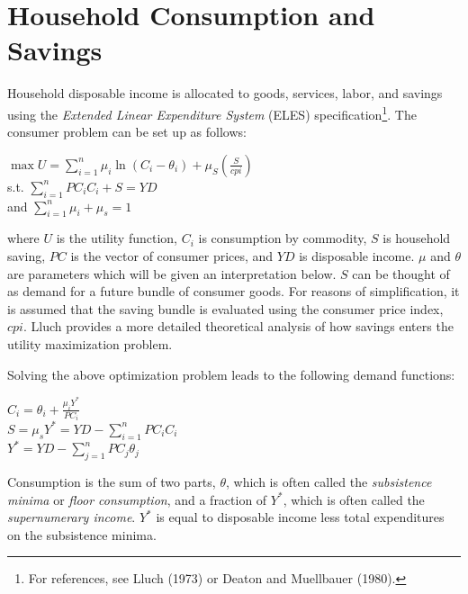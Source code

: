 \documentclass[12pt]{article}
\begin{document}
\section{Household Consumption and Savings}

Household disposable income is allocated to goods, services, labor, and savings using the \textit{Extended Linear Expenditure System} (ELES) specification\footnote{For references, see Lluch (1973) or Deaton and Muellbauer (1980).}. The consumer problem can be set up as follows:

\begin{center}

$\max U = \displaystyle \sum_{i=1}^n\mu_i\ln(C_i - \theta_i) + \mu_S\left(\frac{S}{cpi}\right)$\\
s.t. $\displaystyle \sum_{i=1}^n PC_iC_i + S = YD$\\
and $\sum_{i=1}^n\mu_i + \mu_s = 1$

\end{center}

where $U$ is the utility function, $C_i$ is consumption by commodity, $S$ is household saving, $PC$ is the vector of consumer prices, and $YD$ is disposable income. $\mu$ and $\theta$ are parameters which will be given an interpretation below. $S$ can be thought of as demand for a future bundle of consumer goods. For reasons of simplification, it is assumed that the saving bundle is evaluated using the consumer price index, $cpi$. Lluch provides a more detailed theoretical analysis of how savings enters the utility maximization problem.

Solving the above optimization problem leads to the following demand functions:
\begin{center}

$C_i = \theta_i + \frac{\mu_iY^*}{PC_i}$\\
$S = \mu_sY^* = YD - \displaystyle \sum_{i=1}^nPC_iC_i$\\
$Y^* = YD - \displaystyle \sum_{j=1}^nPC_j\theta_j$

\end{center}

Consumption is the sum of two parts, $\theta$, which is often called the \textit{subsistence minima} or \textit{floor consumption}, and a fraction of $Y^*$, which is often called the \textit{supernumerary income}. $Y^*$ is equal to disposable income less total expenditures on the subsistence minima.
\end{document}
